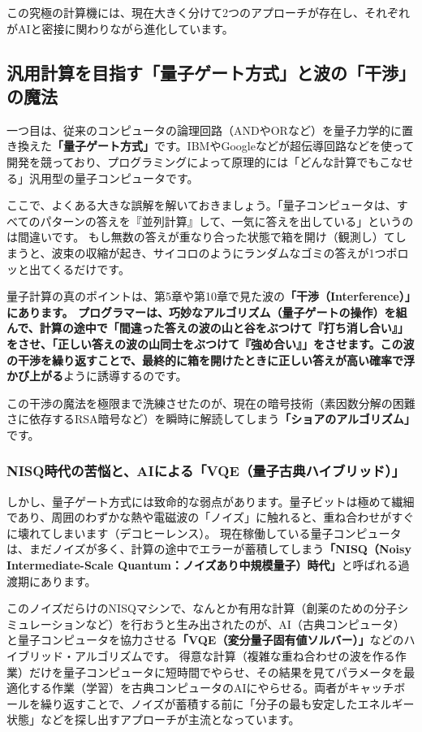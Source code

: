 この究極の計算機には、現在大きく分けて2つのアプローチが存在し、それぞれがAIと密接に関わりながら進化しています。

\subsection{汎用計算を目指す「量子ゲート方式」と波の「干渉」の魔法}

一つ目は、従来のコンピュータの論理回路（ANDやORなど）を量子力学的に置き換えた\textbf{「量子ゲート方式」}です。IBMやGoogleなどが超伝導回路などを使って開発を競っており、プログラミングによって原理的には「どんな計算でもこなせる」汎用型の量子コンピュータです。

ここで、よくある大きな誤解を解いておきましょう。「量子コンピュータは、すべてのパターンの答えを『並列計算』して、一気に答えを出している」というのは間違いです。 もし無数の答えが重なり合った状態で箱を開け（観測し）てしまうと、波束の収縮が起き、サイコロのようにランダムなゴミの答えが1つポロッと出てくるだけです。

量子計算の真のポイントは、第5章や第10章で見た波の\textbf{「干渉（Interference）」にあります。 プログラマーは、巧妙なアルゴリズム（量子ゲートの操作）を組んで、計算の途中で「間違った答えの波の山と谷をぶつけて『打ち消し合い』」をさせ、「正しい答えの波の山同士をぶつけて『強め合い』」をさせます。この波の干渉を繰り返すことで、最終的に箱を開けたときに正しい答えが高い確率で浮かび上がる}ように誘導するのです。

この干渉の魔法を極限まで洗練させたのが、現在の暗号技術（素因数分解の困難さに依存するRSA暗号など）を瞬時に解読してしまう\textbf{「ショアのアルゴリズム」}です。

\subsubsection{NISQ時代の苦悩と、AIによる「VQE（量子古典ハイブリッド）」}

しかし、量子ゲート方式には致命的な弱点があります。量子ビットは極めて繊細であり、周囲のわずかな熱や電磁波の「ノイズ」に触れると、重ね合わせがすぐに壊れてしまいます（デコヒーレンス）。 現在稼働している量子コンピュータは、まだノイズが多く、計算の途中でエラーが蓄積してしまう\textbf{「NISQ（Noisy Intermediate-Scale Quantum：ノイズあり中規模量子）時代」}と呼ばれる過渡期にあります。

このノイズだらけのNISQマシンで、なんとか有用な計算（創薬のための分子シミュレーションなど）を行おうと生み出されたのが、AI（古典コンピュータ）と量子コンピュータを協力させる\textbf{「VQE（変分量子固有値ソルバー）」}などのハイブリッド・アルゴリズムです。 得意な計算（複雑な重ね合わせの波を作る作業）だけを量子コンピュータに短時間でやらせ、その結果を見てパラメータを最適化する作業（学習）を古典コンピュータのAIにやらせる。両者がキャッチボールを繰り返すことで、ノイズが蓄積する前に「分子の最も安定したエネルギー状態」などを探し出すアプローチが主流となっています。

